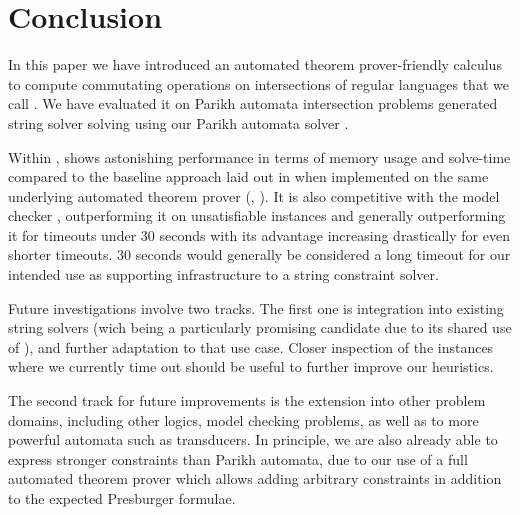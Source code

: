 \documentclass[acmsmall,review,anonymous,screen]{acmart}\settopmatter{printfolios=true,printccs=false,printacmref=true}
\theoremstyle{definition}
\begin{document}
\section{Conclusion}

In this paper we have introduced an automated theorem prover-friendly calculus
to compute commutating operations on intersections of regular languages that we
call \Calculus{}. We have evaluated it on \NrBenchmarks{} Parikh automata
intersection problems generated  string solver
\cite{ostrich} solving  using our
Parikh automata solver \Catra{}.

Within \Catra{}, \Calculus{} shows astonishing performance in terms of memory
usage and solve-time compared to the baseline approach laid out in
\cite{generate-parikh-image} when implemented on the same underlying automated
theorem prover (\Princess{}, \cite{princess}). It is also competitive with the
\Nuxmv{} model checker \cite{nuxmv}, outperforming it on unsatisfiable instances
and generally outperforming it for timeouts under 30 seconds with its advantage
increasing drastically for even shorter timeouts. 30 seconds would generally be
considered a long timeout for our intended use as supporting infrastructure to a
string constraint solver.

Future investigations involve two tracks. The first one is integration into
existing string solvers (wich \Ostrich{} being a particularly promising
candidate due to its shared use of \Princess{}), and further adaptation to that
use case. Closer inspection of the instances where we currently time out should
be useful to further improve our heuristics.

The second track for future improvements is the extension into other problem
domains, including other logics, model checking problems, as well as to more
powerful automata such as transducers. In principle, we are also already able to
express stronger constraints than Parikh automata, due to our use of a full
automated theorem prover which allows adding arbitrary constraints in addition
to the expected Presburger formulae.

\end{document}
